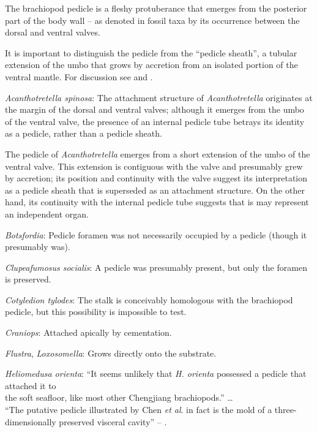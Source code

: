 \documentclass[openany]{book}
\theoremstyle{definition}
\theoremstyle{definition}
\theoremstyle{definition}
\theoremstyle{remark}
\begin{document}
The brachiopod pedicle is a fleshy protuberance that emerges from the
posterior part of the body wall -- as denoted in fossil taxa by its
occurrence between the dorsal and ventral valves.

It is important to distinguish the pedicle from the ``pedicle sheath'',
a tubular extension of the umbo that grows by accretion from an isolated
portion of the ventral mantle. For discussion see
\citet{Holmer2018Theattachment} and \citet{Bassett2017Earliestontogeny}.

\hypertarget{Acanthotretella_spinosa-coding-163}{}
\emph{Acanthotretella spinosa}: The attachment structure of
\emph{Acanthotretella} originates at the margin of the dorsal and
ventral valves; although it emerges from the umbo of the ventral valve,
the presence of an internal pedicle tube betrays its identity as a
pedicle, rather than a pedicle sheath.

The pedicle of \emph{Acanthotretella} emerges from a short extension of
the umbo of the ventral valve. This extension is contiguous with the
valve and presumably grew by accretion; its position and continuity with
the valve suggest its interpretation as a pedicle sheath that is
superseded as an attachment structure. On the other hand, its continuity
with the internal pedicle tube suggests that is may represent an
independent organ.

\hypertarget{Botsfordia-coding-163}{}
\emph{Botsfordia}: Pedicle foramen was not necessarily occupied by a
pedicle (though it presumably was).

\hypertarget{Clupeafumosus_socialis-coding-163}{}
\emph{Clupeafumosus socialis}: A pedicle was presumably present, but
only the foramen is preserved.

\hypertarget{Cotyledion_tylodes-coding-163}{}
\emph{Cotyledion tylodes}: The stalk is conceivably homologous with the
brachiopod pedicle, but this possibility is impossible to test.

\hypertarget{Craniops-coding-163}{}
\emph{Craniops}: Attached apically by cementation.

\hypertarget{Flustra-coding-163}{}
\emph{Flustra}, \emph{Loxosomella}: Grows directly onto the substrate.

\hypertarget{Heliomedusa_orienta-coding-163}{}
\emph{Heliomedusa orienta}: ``It seems unlikely that \emph{H. orienta}
possessed a pedicle that attached it to\\
the soft seafloor, like most other Chengjiang brachiopods.'' \ldots{}\\
``The putative pedicle illustrated by Chen \emph{et al}.
\citeyearpar[Figs 4, 6, 7]{Chen2007Reinterpretationof} in fact is the
mold of a three-dimensionally preserved visceral cavity'' --
\citet{Zhang2009Architectureand}.
\end{document}
